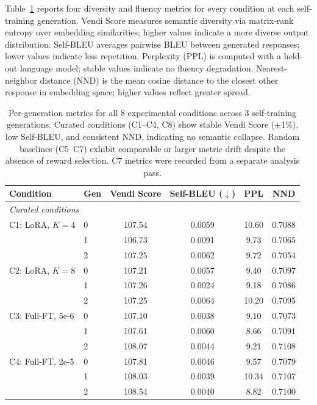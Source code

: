 Table~\ref{tab:per_gen_metrics} reports four diversity and fluency metrics for every condition at each self-training generation.
Vendi Score measures semantic diversity via matrix-rank entropy over embedding similarities; higher values indicate a more diverse output distribution.
Self-BLEU averages pairwise BLEU between generated responses; lower values indicate less repetition.
Perplexity (PPL) is computed with a held-out language model; stable values indicate no fluency degradation.
Nearest-neighbor distance (NND) is the mean cosine distance to the closest other response in embedding space; higher values reflect greater spread.

\begin{table}[t]
\centering
\small
\caption{Per-generation metrics for all 8 experimental conditions across 3 self-training generations. Curated conditions (C1--C4, C8) show stable Vendi Score ($\pm$1\%), low Self-BLEU, and consistent NND, indicating no semantic collapse. Random baselines (C5--C7) exhibit comparable or larger metric drift despite the absence of reward selection. C7 metrics were recorded from a separate analysis pass.}
\label{tab:per_gen_metrics}
\begin{tabular}{@{}llcccc@{}}
\toprule
Condition & Gen & Vendi Score & Self-BLEU ($\downarrow$) & PPL & NND \\
\midrule
\multicolumn{6}{l}{\textit{Curated conditions}} \\
\midrule
C1: LoRA, $K{=}4$
  & 0 & 107.54 & 0.0059 & 10.60 & 0.7088 \\
  & 1 & 106.73 & 0.0091 &  9.73 & 0.7065 \\
  & 2 & 107.25 & 0.0062 &  9.72 & 0.7054 \\
\midrule
C2: LoRA, $K{=}8$
  & 0 & 107.21 & 0.0057 &  9.40 & 0.7097 \\
  & 1 & 107.26 & 0.0024 &  9.18 & 0.7086 \\
  & 2 & 107.25 & 0.0064 & 10.20 & 0.7095 \\
\midrule
C3: Full-FT, 5e-6
  & 0 & 107.10 & 0.0038 &  9.10 & 0.7073 \\
  & 1 & 107.61 & 0.0060 &  8.66 & 0.7091 \\
  & 2 & 108.07 & 0.0044 &  9.21 & 0.7108 \\
\midrule
C4: Full-FT, 2e-5
  & 0 & 107.81 & 0.0046 &  9.57 & 0.7079 \\
  & 1 & 108.03 & 0.0039 & 10.34 & 0.7107 \\
  & 2 & 108.54 & 0.0040 &  8.82 & 0.7100 \\
\midrule

\end{tabular}
\end{table}
